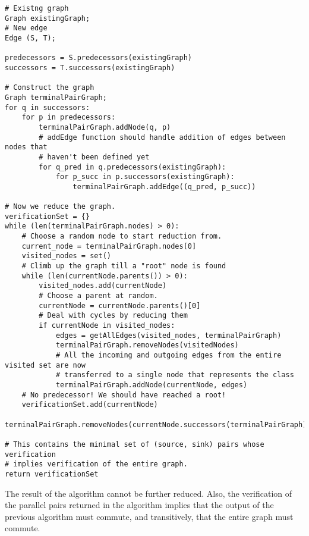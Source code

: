 \documentclass{article}
\begin{document}
\begin{verbatim}
# Existng graph
Graph existingGraph;
# New edge
Edge (S, T);

predecessors = S.predecessors(existingGraph)
successors = T.successors(existingGraph)

# Construct the graph
Graph terminalPairGraph;
for q in successors:
    for p in predecessors:
        terminalPairGraph.addNode(q, p)
        # addEdge function should handle addition of edges between nodes that 
        # haven't been defined yet
        for q_pred in q.predecessors(existingGraph):
            for p_succ in p.successors(existingGraph):
                terminalPairGraph.addEdge((q_pred, p_succ))

# Now we reduce the graph.
verificationSet = {}
while (len(terminalPairGraph.nodes) > 0):
    # Choose a random node to start reduction from.
    current_node = terminalPairGraph.nodes[0]
    visited_nodes = set()
    # Climb up the graph till a "root" node is found
    while (len(currentNode.parents()) > 0):
        visited_nodes.add(currentNode)
        # Choose a parent at random.
        currentNode = currentNode.parents()[0]
        # Deal with cycles by reducing them
        if currentNode in visited_nodes:
            edges = getAllEdges(visited_nodes, terminalPairGraph)
            terminalPairGraph.removeNodes(visitedNodes)
            # All the incoming and outgoing edges from the entire visited set are now 
            # transferred to a single node that represents the class
            terminalPairGraph.addNode(currentNode, edges)
    # No predecessor! We should have reached a root!
    verificationSet.add(currentNode)
    terminalPairGraph.removeNodes(currentNode.successors(terminalPairGraph)

# This contains the minimal set of (source, sink) pairs whose verification 
# implies verification of the entire graph. 
return verificationSet

\end{verbatim}

The result of the algorithm cannot be further reduced. Also, the verification of the parallel pairs returned in the algorithm implies that the output of the previous algorithm must commute, and transitively, that the entire graph must commute.
\end{document}
